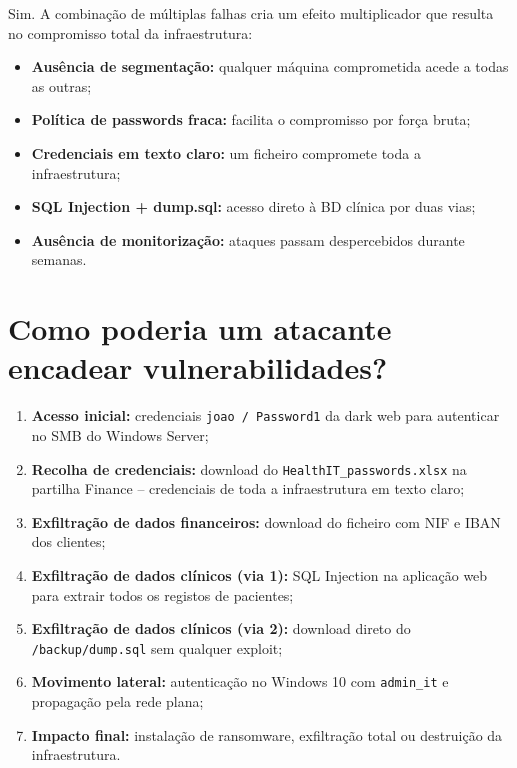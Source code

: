 \documentclass[12pt, a4paper]{report}
\begin{document}
Sim. A combinação de múltiplas falhas cria um efeito multiplicador que resulta no compromisso
total da infraestrutura:

\begin{itemize}[itemsep=2pt]
  \item \textbf{Ausência de segmentação:} qualquer máquina comprometida acede a todas as outras;
  \item \textbf{Política de passwords fraca:} facilita o compromisso por força bruta;
  \item \textbf{Credenciais em texto claro:} um ficheiro compromete toda a infraestrutura;
  \item \textbf{SQL Injection + dump.sql:} acesso direto à BD clínica por duas vias;
  \item \textbf{Ausência de monitorização:} ataques passam despercebidos durante semanas.
\end{itemize}

\section{Como poderia um atacante encadear vulnerabilidades?}

\begin{enumerate}[leftmargin=*,itemsep=4pt]
  \item \textbf{Acesso inicial:} credenciais \texttt{joao / Password1} da dark web para
        autenticar no SMB do Windows Server;
  \item \textbf{Recolha de credenciais:} download do \texttt{HealthIT\_passwords.xlsx} na
        partilha Finance -- credenciais de toda a infraestrutura em texto claro;
  \item \textbf{Exfiltração de dados financeiros:} download do ficheiro com NIF e IBAN
        dos clientes;
  \item \textbf{Exfiltração de dados clínicos (via 1):} SQL Injection na aplicação web
        para extrair todos os registos de pacientes;
  \item \textbf{Exfiltração de dados clínicos (via 2):} download direto do
        \texttt{/backup/dump.sql} sem qualquer exploit;
  \item \textbf{Movimento lateral:} autenticação no Windows 10 com \texttt{admin\_it}
        e propagação pela rede plana;
  \item \textbf{Impacto final:} instalação de ransomware, exfiltração total ou destruição
        da infraestrutura.
\end{enumerate}
\end{document}
